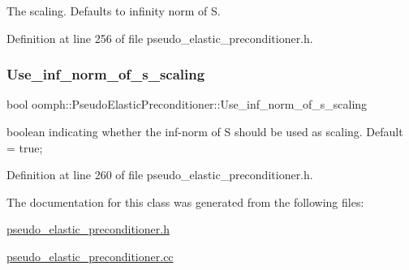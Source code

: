 The scaling. Defaults to infinity norm of S. 



Definition at line 256 of file pseudo\+\_\+elastic\+\_\+preconditioner.\+h.

\mbox{\label{classoomph_1_1PseudoElasticPreconditioner_a3ca651eb7983c61cdaea734b19f2ac25}} 
\subsubsection{\texorpdfstring{Use\+\_\+inf\+\_\+norm\+\_\+of\+\_\+s\+\_\+scaling}{Use\_inf\_norm\_of\_s\_scaling}}
{\footnotesize\ttfamily bool oomph\+::\+Pseudo\+Elastic\+Preconditioner\+::\+Use\+\_\+inf\+\_\+norm\+\_\+of\+\_\+s\+\_\+scaling\hspace{0.3cm}{\ttfamily [private]}}



boolean indicating whether the inf-\/norm of S should be used as scaling. Default = true; 



Definition at line 260 of file pseudo\+\_\+elastic\+\_\+preconditioner.\+h.



The documentation for this class was generated from the following files\+:\begin{DoxyCompactItemize}
\item 
\hyperlink{pseudo__elastic__preconditioner_8h}{pseudo\+\_\+elastic\+\_\+preconditioner.\+h}\item 
\hyperlink{pseudo__elastic__preconditioner_8cc}{pseudo\+\_\+elastic\+\_\+preconditioner.\+cc}\end{DoxyCompactItemize}
